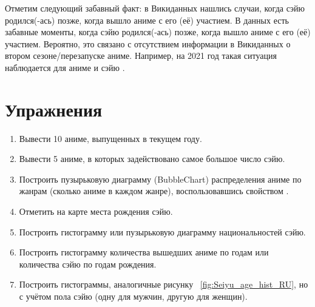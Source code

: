 \begin{figure*}[h]

    \setlength{\fboxsep}{0pt}%
    \setlength{\fboxrule}{1pt}%
	\caption[Гистограмма, которая отображает число аниме, озвученное сэйю разных возрастов, 2021.]{Гистограмма, которая показывает число аниме, озвученных различными сэйю, 2021. Гистограмма построена на основе данных, полученных с помощью запроса ~\protect\ref{lst:link_anime_seiyu}.}%
    \label{fig:Seiyu_age_hist_RU}%
\end{figure*} 
 	
Отметим следующий забавный факт: в Викиданных нашлись случаи, когда сэйю родился(-ась) позже, когда вышло аниме с его (её) участием. В данных есть забавные моменты, когда сэйю родился(-ась) позже, когда вышло аниме с его (её) участием. Вероятно, это связано с отсутствием информации в Викиданных о втором сезоне/перезапуске аниме. Например, на 2021 год такая ситуация наблюдается для аниме  и сэйю .

\section{Упражнения}

\begin{enumerate}
    \item Вывести 10 аниме, выпущенных в текущем году.
    \item Вывести 5 аниме, в которых задействовано самое большое число сэйю.
    \item Построить пузырьковую диаграмму (BubbleChart) распределения аниме по жанрам (сколько аниме в каждом жанре), воспользовавшись свойством .
    \item Отметить на карте места рождения сэйю.
    \item Построить гистограмму или пузырьковую диаграмму национальностей сэйю.
    \item Построить гистограмму количества вышедших аниме по годам или количества сэйю по годам рождения.
    \item Построить гистограммы, аналогичные рисунку ~\ref{fig:Seiyu_age_hist_RU}, но с учётом пола сэйю (одну для мужчин, другую для женщин).
\end{enumerate}